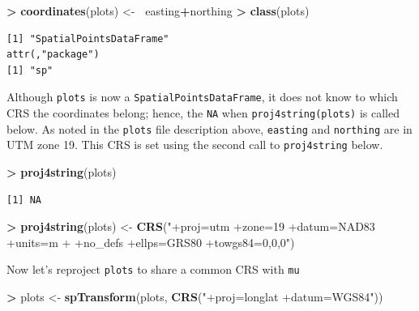 \documentclass[]{krantz}
\makeatletter
\newenvironment{Shaded}{\begin{snugshade}}{\end{snugshade}}
\newcommand{\KeywordTok}[1]{\textcolor[rgb]{0.27,0.27,0.27}{\textbf{#1}}}
\newcommand{\StringTok}[1]{\textcolor[rgb]{0.5,0.5,0.5}{#1}}
\newcommand{\OperatorTok}[1]{\textcolor[rgb]{0.43,0.43,0.43}{\textbf{#1}}}
\newcommand{\ErrorTok}[1]{\textcolor[rgb]{0.14,0.14,0.14}{\textbf{#1}}}
\newcommand{\NormalTok}[1]{#1}
\newenvironment{kframe}{%
\medskip{}
\setlength{\fboxsep}{.8em}
 \def\at@end@of@kframe{}%
 \ifinner\ifhmode%
  \def\at@end@of@kframe{\end{minipage}}%
  \begin{minipage}{\columnwidth}%
 \fi\fi%
 \def\FrameCommand##1{\hskip\@totalleftmargin \hskip-\fboxsep
 \colorbox{shadecolor}{##1}\hskip-\fboxsep
     \hskip-\linewidth \hskip-\@totalleftmargin \hskip\columnwidth}%
 \MakeFramed {\advance\hsize-\width
   \@totalleftmargin\z@ \linewidth\hsize
   \@setminipage}}%
 {\par\unskip\endMakeFramed%
 \at@end@of@kframe}
\renewenvironment{Shaded}{\begin{kframe}}{\end{kframe}}
\makeatother
\begin{document}
\begin{Shaded}
\begin{Highlighting}[]
\OperatorTok{>}\StringTok{ }\KeywordTok{coordinates}\NormalTok{(plots) <-}\StringTok{ }\ErrorTok{~}\NormalTok{easting}\OperatorTok{+}\NormalTok{northing}
\OperatorTok{>}\StringTok{ }\KeywordTok{class}\NormalTok{(plots)}
\end{Highlighting}
\end{Shaded}

\begin{verbatim}
[1] "SpatialPointsDataFrame"
attr(,"package")
[1] "sp"
\end{verbatim}

Although \texttt{plots} is now a \texttt{SpatialPointsDataFrame}, it
does not know to which CRS the coordinates belong; hence, the
\texttt{NA} when \texttt{proj4string(plots)} is called below. As noted
in the \texttt{plots} file description above, \texttt{easting} and
\texttt{northing} are in UTM zone 19. This CRS is set using the second
call to \texttt{proj4string} below.

\begin{Shaded}
\begin{Highlighting}[]
\OperatorTok{>}\StringTok{ }\KeywordTok{proj4string}\NormalTok{(plots)}
\end{Highlighting}
\end{Shaded}

\begin{verbatim}
[1] NA
\end{verbatim}

\begin{Shaded}
\begin{Highlighting}[]
\OperatorTok{>}\StringTok{ }\KeywordTok{proj4string}\NormalTok{(plots) <-}\StringTok{ }\KeywordTok{CRS}\NormalTok{(}\StringTok{"+proj=utm +zone=19 +datum=NAD83 +units=m }
\StringTok{+                              +no_defs +ellps=GRS80 +towgs84=0,0,0"}\NormalTok{)                   }
\end{Highlighting}
\end{Shaded}

Now let's reproject \texttt{plots} to share a common CRS with
\texttt{mu}

\begin{Shaded}
\begin{Highlighting}[]
\OperatorTok{>}\StringTok{ }\NormalTok{plots <-}\StringTok{ }\KeywordTok{spTransform}\NormalTok{(plots, }\KeywordTok{CRS}\NormalTok{(}\StringTok{"+proj=longlat +datum=WGS84"}\NormalTok{))}
\end{Highlighting}
\end{Shaded}
\end{document}
